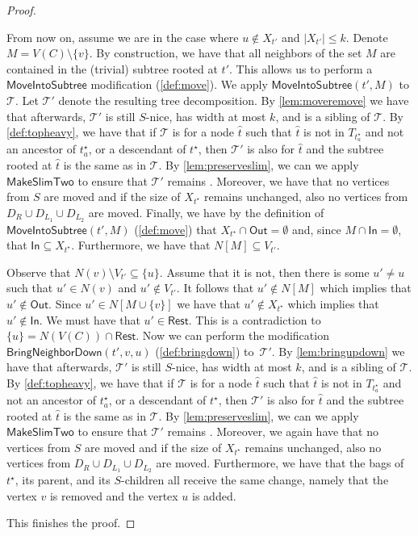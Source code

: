 \documentclass[a4paper,UKenglish,cleveref, autoref, thm-restate, numberwithinsect]{lipics-v2021}
\newcounter{modification}
\newcommand{\slim}{\text{slim}\xspace}
\newcommand{\topheavy}{\text{top-heavy}\xspace}
\newcommand{\In}{\mathsf{In}}
\newcommand{\Out}{\mathsf{Out}}
\newcommand{\Rest}{\mathsf{Rest}}
\newcommand{\MoveIntoSubtree}{\mathsf{MoveIntoSubtree}}
\newcommand{\BringNeighborDown}{\mathsf{BringNeighborDown}}
\newcommand{\MakeSlimTwo}{\mathsf{MakeSlimTwo}}
\begin{document}
\begin{proof}
\begin{enumerate}
From now on, assume we are in the case where $u\notin X_{t'}$ and $|X_{t'}|\le k$.
Denote $M=V(C)\setminus\{v\}$. 
By construction, we have that all neighbors of the set $M$ are contained in the (trivial) subtree rooted at $t'$.
 This allows us to perform a $\MoveIntoSubtree$ modification (\cref{def:move}). We apply $\MoveIntoSubtree(t',M)$ to $\mathcal{T}$. Let $\mathcal{T}'$ denote the resulting tree decomposition.
By \cref{lem:moveremove} we have that afterwards, $\mathcal{T}'$ is still $S$-nice, has width at most $k$, and is a sibling of $\mathcal{T}$. 
        By \cref{def:topheavy}, we have that
        if $\mathcal{T}$ is \topheavy for a node $\hat{t}$ such that $\hat{t}$ is not in $T_{t^\star_a}$ and not an ancestor of $t^\star_a$, or
         a descendant of $t^\star$,
then $\mathcal{T}'$ is also \topheavy for $\hat{t}$ and the subtree rooted at $\hat{t}$ is the same as in $\mathcal{T}$.
By \cref{lem:preserveslim}, we can we apply $\MakeSlimTwo$ to ensure that $\mathcal{T}'$ remains \slim.
Moreover, we have that no vertices from $S$ are moved and if the size of $X_{t^\star}$ remains unchanged, also no vertices from $D_R\cup D_{L_1}\cup D_{L_2}$ are moved.
Finally, we have by the definition of $\MoveIntoSubtree(t',M)$ (\cref{def:move}) that $X_{t^\star}\cap \Out=\emptyset$ and, since $M\cap \In=\emptyset$, that $\In\subseteq X_{t^\star}$. Furthermore, we have that $N[M]\subseteq V_{t'}$.         
        
        
        
        Observe that $N(v)\setminus V_{t'}\subseteq \{u\}$. Assume that it is not, then there is some $u'\neq u$ such that $u'\in N(v)$ and $u'\notin V_{t'}$. It follows that $u'\notin N[M]$ which implies that $u'\notin \Out$. Since $u'\in N[M\cup\{v\}]$ we have that $u'\notin X_{t^\star}$ which implies that $u'\notin \In$. We must have that $u'\in\Rest$. This is a contradiction to $\{u\}=N(V(C))\cap \Rest$.
Now we can perform the modification $\BringNeighborDown(t',v,u)$ (\cref{def:bringdown}) to~$\mathcal{T}'$.
By \cref{lem:bringupdown} we have that afterwards, $\mathcal{T}'$ is still $S$-nice, has width at most $k$, and is a sibling of $\mathcal{T}$. 
        By \cref{def:topheavy}, we have that
        if $\mathcal{T}$ is \topheavy for a node $\hat{t}$ such that $\hat{t}$ is not in $T_{t^\star_a}$ and not an ancestor of $t^\star_a$, or
         a descendant of $t^\star$,
then $\mathcal{T}'$ is also \topheavy for $\hat{t}$ and the subtree rooted at $\hat{t}$ is the same as in $\mathcal{T}$.
By \cref{lem:preserveslim}, we can we apply $\MakeSlimTwo$ to ensure that $\mathcal{T}'$ remains \slim.
Moreover, we again have that no vertices from $S$ are moved and if the size of $X_{t^\star}$ remains unchanged, also no vertices from $D_R\cup D_{L_1}\cup D_{L_2}$ are moved. 
Furthermore, we have that the bags of~$t^\star$, its parent, and its $S$-children all receive the same change, namely that the vertex $v$ is removed and the vertex $u$ is added. 
\end{enumerate}
    This finishes the proof.
\end{proof}
\end{document}
